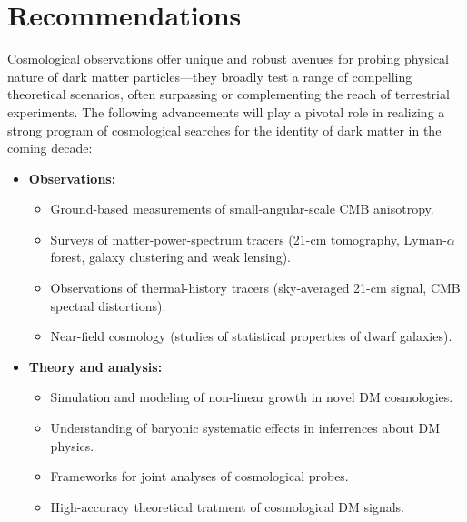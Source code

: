 \documentclass[12pt]{article}
\begin{document}
\vspace{-0.3cm}
\section{Recommendations}
\label{sec:recommendations}
\vspace{-0.2cm}
Cosmological observations offer unique and robust avenues for probing physical nature of dark matter particles---they broadly test a range of compelling theoretical scenarios, often surpassing or complementing the reach of terrestrial experiments.
The following advancements will play a pivotal role in realizing a strong program of cosmological searches for the identity of dark matter in the coming decade:
\begin{itemize}
    \item \textbf{Observations:}
    \begin{itemize}
        \item Ground-based measurements of small-angular-scale CMB anisotropy.
        \item Surveys of matter-power-spectrum tracers (21-cm tomography, Lyman-$\alpha$ forest, galaxy clustering and weak lensing).
        \item Observations of thermal-history tracers (sky-averaged 21-cm signal, CMB spectral distortions).
        \item Near-field cosmology (studies of statistical properties of dwarf galaxies).
    \end{itemize}
    \item \textbf{Theory and analysis:}
    \begin{itemize}
        \item Simulation and modeling of non-linear growth in novel DM cosmologies.
        \item Understanding of baryonic systematic effects in inferrences about DM physics.
        \item Frameworks for joint analyses of cosmological probes.
        \item High-accuracy theoretical tratment of cosmological DM signals. \end{itemize}
\end{itemize}


\end{document}
